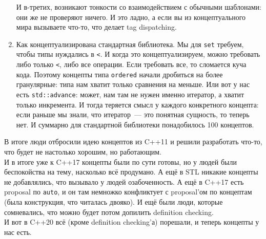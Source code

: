 \documentclass{article}
\begin{document}
\begin{enumerate}
        И в-третих, возникают тонкости со взаимодействием с обычными шаблонами: они же не проверяют ничего. И это ладно, а если вы из концептуального мира вызываете что-то, что делает tag dispatching.
        \item Как концептуализирована стандартная библиотека. Мы для \texttt{set} требуем, чтобы типы нуждались в \texttt{<}. И когда это концептуализируем, можно требовать либо только \texttt{<}, либо все операции. Если требовать все, то сломается куча кода. Поэтому концепты типа \texttt{ordered} начали дробиться на более гранулярные: типа нам хватит только сравнения на меньше. Или вот у нас есть \texttt{std::advance}: может, нам там не нужен именно итератор, а хватит только инкремента. И тогда теряется смысл у каждого конкретного концепта: если раньше мы знали, что итератор~--- это понятная сущность, то теперь нет. И суммарно для стандартной библиотеки понадобилось 100 концептов.
    \end{enumerate}
    В итоге люди отбросили идею концептов из C++11 и решили разработать что-то, что будет не настолько хорошим, но работающим.\\
    И в итоге уже к C++17 концепты были по сути готовы, но у людей были беспокойства на тему, насколько всё продумано. А ещё в STL никакие концепты не добавлялись, что вызывало у людей озабоченность. А ещё в C++17 есть proposal по \texttt{auto}, и он там немножко конфликтует с proposal'ом по концептам (была конструкция, что читалась двояко). И ещё были люди, которые сомневались, что можно будет потом допилить definition checking.\\
    И вот в C++20 всё (кроме definition checking'а) порешали, и теперь концепты у нас есть.
\end{document}
